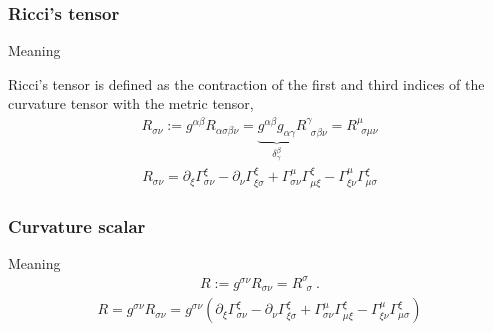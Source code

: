 \documentclass[letterpaper,10pt,english]{jupyterBook}
\begin{document}
\subsubsection{Ricci’s tensor}
\label{\detokenize{ch/relativity-general/differential-geometry:ricci-s-tensor}}\label{\detokenize{ch/relativity-general/differential-geometry:relativity-general-notes-differential-geometry-curvature-tensor-ricci}}
\sphinxAtStartPar
{} Meaning

\sphinxAtStartPar
Ricci’s tensor is defined as the contraction of the first and third indices of the curvature tensor with the metric tensor,
\begin{equation*}
\begin{split}R_{\sigma \nu} := g^{\alpha \beta} R_{\alpha \sigma \beta \nu} = \underbrace{g^{\alpha \beta} g_{\alpha \gamma}}_{\delta_{\gamma}^{\beta}} R^{\gamma}_{\ \ \sigma \beta \nu} = R^{\mu}_{\ \ \sigma \mu \nu}\end{split}
\end{equation*}\begin{equation*}
\begin{split}R_{\sigma \nu} = \partial_{\xi} \Gamma^{\xi}_{\sigma \nu} - \partial_{\nu} \Gamma^{\xi}_{\xi \sigma} + \Gamma_{\sigma \nu}^{\mu} \Gamma_{\mu \xi}^{\xi} - \Gamma_{\xi \nu}^{\mu} \Gamma^{\xi}_{\mu \sigma}\end{split}
\end{equation*}

\subsubsection{Curvature scalar}
\label{\detokenize{ch/relativity-general/differential-geometry:curvature-scalar}}\label{\detokenize{ch/relativity-general/differential-geometry:relativity-general-notes-differential-geometry-curvature-tensor-curvature-scalar}}
\sphinxAtStartPar
{} Meaning
\begin{equation*}
\begin{split}R := g^{\sigma \nu} R_{\sigma \nu} = R^{\sigma}_{\ \ \sigma} \ .\end{split}
\end{equation*}\begin{equation*}
\begin{split}R = g^{\sigma \nu} R_{\sigma \nu} = g^{\sigma \nu} \left( \partial_{\xi} \Gamma^{\xi}_{\sigma \nu} - \partial_{\nu} \Gamma^{\xi}_{\xi \sigma} + \Gamma_{\sigma \nu}^{\mu} \Gamma_{\mu \xi}^{\xi} - \Gamma_{\xi \nu}^{\mu} \Gamma^{\xi}_{\mu \sigma} \right)\end{split}
\end{equation*}
\end{document}
